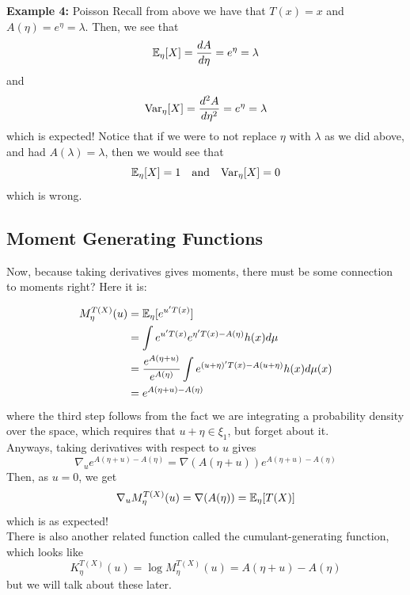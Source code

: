 \begin{example}{\textbf{Example 4:} Poisson}
    Recall from above we have that $T(x) = x$ and $A(\eta) = e^{\eta} = \lambda$. Then, we see that
    \[ \bb{E}_{\eta}[X] = \frac{dA}{d\eta} = e^{\eta} = \lambda \]
    and
    \[ \tt{Var}_{\eta}[X] = \frac{d^{2}A}{d\eta^2} = e^{\eta} = \lambda \]
    which is expected! Notice that if we were to not replace $\eta$ with $\lambda$ as we did above, and had $A(\lambda) = \lambda$, then we would see that
    \[ \bb{E}_{\eta}[X] = 1 \quand \tt{Var}_{\eta}[X] = 0 \]
    which is wrong.
\end{example}
\clearpage

\subsection*{Moment Generating Functions}

Now, because taking derivatives gives moments, there must be some connection to moments right? Here it is:

\begin{align*}
    M_{\eta}^{T(X)}(u) &= \bb{E}_{\eta}[e^{u'T(x)}]\\
    &= \int e^{u'T(x)}e^{\eta'T(x) - A(\eta)}h(x)d\mu\\
    &= \frac{e^{A(\eta + u)}}{e^{A(\eta)}}\int e^{(u + \eta)'T(x) - A(u + \eta)}h(x)d\mu(x)\\
    &= e^{A(\eta + u) - A(\eta)}
\end{align*}
where the third step follows from the fact we are integrating a probability density over the space, which requires that $u + \eta \in \xi_1$, but forget about it. \\

Anyways, taking derivatives with respect to $u$ gives
\[ \nabla_{u} e^{A(\eta + u) - A(\eta)} = \nabla(A(\eta + u))e^{A(\eta + u) - A(\eta)} \]
Then, as $u = 0$, we get
\[ \nabla_{u} M_{\eta}^{T(X)}(u) = \nabla(A(\eta)) = \E_{\eta}[T(X)] \]
which is as expected!\\

There is also another related function called the cumulant-generating function, which looks like
\[ K_{\eta}^{T(X)}(u) = \log M_{\eta}^{T(X)}(u) = A(\eta + u) - A(\eta) \]
but we will talk about these later. 
